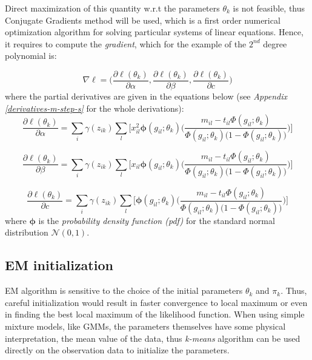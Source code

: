 Direct maximization of this quantity w.r.t the parameters $\theta_{k}$ is not feasible, thus Conjugate Gradients method \citep{Hestenes1952} will be used, which is a first order numerical optimization algorithm for solving particular systems of linear equations. Hence, it requires to compute the \emph{gradient}, which for the example of the $2^{nd}$ degree polynomial is:

\begin{equation} \label{gradient-f}
	\nabla\ell = \bigg( \frac{\partial \ell(\theta_{k})}{\partial \alpha}, \frac{\partial \ell(\theta_{k})}{\partial \beta}, \frac{\partial \ell(\theta_{k})}{\partial c}\bigg) 
\end{equation}
where the partial derivatives are given in the equations below (see \emph{Appendix \ref{derivatives-m-step-s}} for the whole derivations):
\begin{equation} \label{derivative-a-f}
	\frac{\partial \ell(\theta_{k})}{\partial \alpha} =  \sum_{i}  \gamma(z_{ik}) \sum_{l} \bigg[ x_{il}^{2} \mathbf{\phi}(g_{il};\theta_{k})\bigg(\frac{m_{il} - t_{il}\Phi(g_{il};\theta_{k})}{\Phi(g_{il};\theta_{k})\big(1-\Phi(g_{il};\theta_{k})\big)} \bigg) \bigg]
\end{equation}

\begin{equation} \label{derivative-b-f}
	\frac{\partial \ell(\theta_{k})}{\partial \beta} =  \sum_{i}  \gamma(z_{ik}) \sum_{l} \bigg[ x_{il} \mathbf{\phi}(g_{il};\theta_{k})\bigg(\frac{m_{il} - t_{il}\Phi(g_{il};\theta_{k})}{\Phi(g_{il};\theta_{k})\big(1-\Phi(g_{il};\theta_{k})\big)} \bigg) \bigg]
\end{equation}

\begin{equation} \label{derivative-c-f}
	\frac{\partial \ell(\theta_{k})}{\partial c} =  \sum_{i}  \gamma(z_{ik}) \sum_{l} \bigg[ \mathbf{\phi}(g_{il};\theta_{k})\bigg(\frac{m_{il} - t_{il}\Phi(g_{il};\theta_{k})}{\Phi(g_{il};\theta_{k})\big(1-\Phi(g_{il};\theta_{k})\big)} \bigg) \bigg]
\end{equation}
where $\mathbf{\phi}$ is the \emph{probability density function (pdf)} for the standard normal distribution $\mathcal{N}(0,1)$.

\subsection{EM initialization}
EM algorithm is sensitive to the choice of the initial parameters $\theta_{k}$ and $\pi_{k}$. Thus, careful initialization would result in faster convergence to local maximum or even in finding the best local maximum of the likelihood function. When using simple mixture models, like GMMs, the parameters themselves have some physical interpretation, \eg the mean value of the data, thus \emph{k-means} algorithm can be used directly on the observation data to initialize the parameters.

